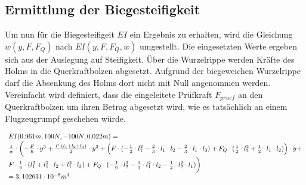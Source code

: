 \subsection{Ermittlung der Biegesteifigkeit}
Um nun für die Biegesteifigeit $EI$ ein Ergebnis zu erhalten, wird die Gleichung $w(y,F,F_{Q})$ nach $EI(y,F,F_{Q},w)$ umgestellt. Die eingesetzten Werte ergeben sich aus der Auslegung auf Steifigkeit. Über die Wurzelrippe werden Kräfte des Holms in die Querkraftbolzen abgesetzt. Aufgrund der biegeweichen Wurzelrippe darf die Absenkung des Holms dort nicht mit Null angenommen werden. Vereinfacht wird definiert, dass die eingeleitete Prüfkraft $F_{pruef}$ an den Querkraftbolzen um ihren Betrag abgesetzt wird, wie es tatsächlich an einem Flugzeugrumpf geschehen würde. 

\begin{equation}
	\begin{array}{l}
		EI(0.961m, 100N, -100N, 0.022m)= \\
		\frac{1}{w}\cdot\biggl(-\frac{F}{6}\cdot y^{3} + \frac{ F\cdot (l_{1}+l_{2}+l_{3})}{2}\cdot y^{2} + \Bigl(F\cdot(-\frac{1}{2}\cdot l_{1}^{2} -\frac{2}{3}\cdot l_{1}\cdot l_{2}-\frac{2}{3}\cdot l_{1}\cdot l_{3}) +		F_{Q}\cdot(\frac{1}{2}\cdot l_{2}^{2}+\frac{1}{2}\cdot l_{1}\cdot l_{2})\Bigr)\cdot y +\\
		F\cdot\frac{1}{6}\cdot(l_{1}^{3}+l_{1}^{2}\cdot l_{2}+l_{1}^{2}\cdot l_{3}) + F_{Q}\cdot(-\frac{1}{6}\cdot l_{2}^{3}-\frac{1}{3}\cdot l_{1}^{2}\cdot l_{2}-\frac{1}{2}\cdot l_{2}^{2}\cdot l_{1})\biggr)\\
		=3,102631\cdot10^{-8}m^{4}
	\end{array}
\end{equation}



